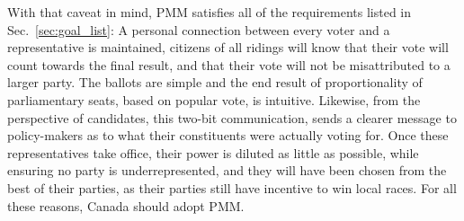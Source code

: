 \documentclass[DIV=calc, paper=a4, fontsize=11pt, twocolumn]{scrartcl}	 %
\begin{document}
With that caveat in mind, PMM satisfies all of the requirements listed in Sec.~\ref{sec:goal_list}: A personal connection between every voter and a representative is maintained, citizens of all ridings will know that their vote will count towards the final result, and that their vote will not be misattributed to a larger party. 
The ballots are simple and the end result of proportionality of parliamentary seats, based on popular vote, is intuitive.
Likewise, from the perspective of candidates, this two-bit communication, sends a clearer message to policy-makers as to what their constituents were actually voting for. 
Once these representatives take office, their power is diluted as little as possible, while ensuring no party is underrepresented, and they will have been chosen from the best of their parties, as their parties still have incentive to win local races. 
For all these reasons, Canada should adopt PMM. 


\end{document}
